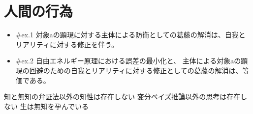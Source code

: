 \section{人間の行為}\label{ux4ebaux9593ux306eux884cux70ba}

\begin{note}{}
  \begin{itemize}
    \tightlist
    \item{\#ex.1}
      対象aの顕現に対する主体による防衛としての葛藤の解消は、自我とリアリティに対する修正を伴う。
    \item{\#ex.2}
      \mbox{自由エネルギー原理}における誤差の最小化と、  主体による対象aの顕現の回避のための自我とリアリティに対する修正としての葛藤の解消は、等価である。
  \end{itemize}
\end{note}

知と無知の\mbox{弁証法}以外の知性は存在しない
変分ベイズ推論以外の思考は存在しない 生は無知を孕んでいる
